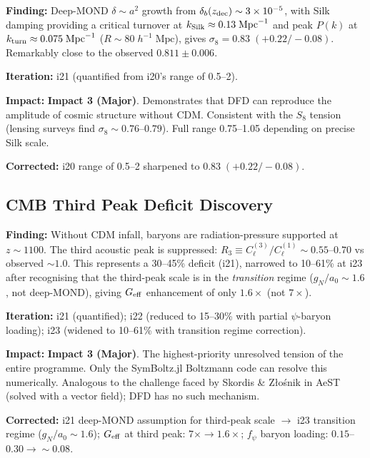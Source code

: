 \documentclass[11pt,a4paper]{article}
\newcommand{\impthree}{\textcolor{impact3}{\textbf{Impact 3 (Major)}}}
\newcommand{\ee}[1]{\times 10^{#1}}
\begin{document}
\begin{tcolorbox}[colback=orange!5!white, colframe=orange!70!black,
  title=\textbf{$\sigma_8 = 0.83$ --- Iteration 21}]

\textbf{Finding:} Deep-MOND $\delta \sim a^2$ growth from
$\delta_b(z_{\rm dec}) \sim 3\ee{-5}$, with Silk damping providing a
critical turnover at $k_{\rm Silk} \approx 0.13\;\mathrm{Mpc}^{-1}$
and peak $P(k)$ at $k_{\rm turn} \approx 0.075\;\mathrm{Mpc}^{-1}$
($R \sim 80\;h^{-1}\;\mathrm{Mpc}$), gives
$\sigma_8 = 0.83\;(+0.22/-0.08)$. Remarkably close to the observed
$0.811 \pm 0.006$.

\textbf{Iteration:} i21 (quantified from i20's range of 0.5--2).

\textbf{Impact:} \impthree. Demonstrates that DFD can reproduce the
amplitude of cosmic structure without CDM. Consistent with the $S_8$
tension (lensing surveys find $\sigma_8 \sim 0.76$--$0.79$). Full range
0.75--1.05 depending on precise Silk scale.

\textbf{Corrected:} i20 range of 0.5--2 sharpened to $0.83\;(+0.22/-0.08)$.

\end{tcolorbox}

\subsection{CMB Third Peak Deficit Discovery}
\label{sec:cmb-third-peak}

\begin{tcolorbox}[colback=orange!5!white, colframe=orange!70!black,
  title=\textbf{CMB Third Peak 10--61\% Deficit --- Iterations 21--23}]

\textbf{Finding:} Without CDM infall, baryons are radiation-pressure
supported at $z \sim 1100$. The third acoustic peak is suppressed:
$R_3 \equiv C_\ell^{(3)} / C_\ell^{(1)} \sim 0.55$--$0.70$ vs
observed $\sim 1.0$. This represents a 30--45\% deficit (i21),
narrowed to 10--61\% at i23 after recognising that the third-peak
scale is in the \emph{transition} regime ($g_N / a_0 \sim 1.6$, not
deep-MOND), giving $G_{\rm eff}$ enhancement of only $1.6\times$
(not $7\times$).

\textbf{Iteration:} i21 (quantified); i22 (reduced to 15--30\% with
partial $\psi$-baryon loading); i23 (widened to 10--61\% with transition
regime correction).

\textbf{Impact:} \impthree. The highest-priority unresolved tension of
the entire programme. Only the SymBoltz.jl Boltzmann code can resolve
this numerically. Analogous to the challenge faced by Skordis \& Z\l o\'snik
in AeST (solved with a vector field); DFD has no such mechanism.

\textbf{Corrected:} i21 deep-MOND assumption for third-peak scale
$\to$ i23 transition regime ($g_N/a_0 \sim 1.6$); $G_{\rm eff}$
at third peak: $7\times \to 1.6\times$; $f_\psi$ baryon loading:
$0.15$--$0.30 \to \sim 0.08$.

\end{tcolorbox}
\end{document}
